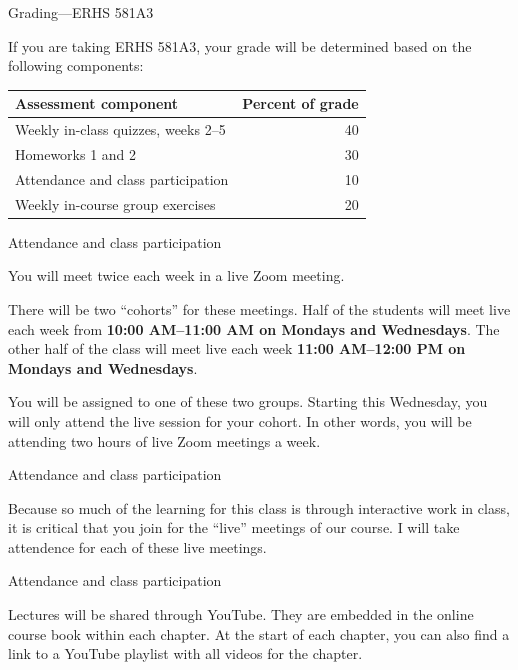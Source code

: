\documentclass[
  10pt,
  ignorenonframetext,
]{beamer}
\begin{document}
\begin{frame}{Grading---ERHS 581A3}
\protect\hypertarget{gradingerhs-581a3}{}

If you are taking ERHS 581A3, your grade will be determined based on the
following components:

\begin{longtable}[]{@{}lr@{}}
\toprule
Assessment component & Percent of grade\tabularnewline
\midrule
\endhead
Weekly in-class quizzes, weeks 2--5 & 40\tabularnewline
Homeworks 1 and 2 & 30\tabularnewline
Attendance and class participation & 10\tabularnewline
Weekly in-course group exercises & 20\tabularnewline
\bottomrule
\end{longtable}

\end{frame}

\begin{frame}{Attendance and class participation}
\protect\hypertarget{attendance-and-class-participation}{}

You will meet twice each week in a live Zoom meeting.

There will be two ``cohorts'' for these meetings. Half of the students
will meet live each week from \textbf{10:00 AM--11:00 AM on Mondays and
Wednesdays}. The other half of the class will meet live each week
\textbf{11:00 AM--12:00 PM on Mondays and Wednesdays}.

You will be assigned to one of these two groups. Starting this
Wednesday, you will only attend the live session for your cohort. In
other words, you will be attending two hours of live Zoom meetings a
week.

\end{frame}

\begin{frame}{Attendance and class participation}
\protect\hypertarget{attendance-and-class-participation-1}{}

Because so much of the learning for this class is through interactive
work in class, it is critical that you join for the ``live'' meetings of
our course. I will take attendence for each of these live meetings.

\end{frame}

\begin{frame}{Attendance and class participation}
\protect\hypertarget{attendance-and-class-participation-2}{}

Lectures will be shared through YouTube. They are embedded in the online
course book within each chapter. At the start of each chapter, you can
also find a link to a YouTube playlist with all videos for the chapter.

\end{frame}
\end{document}
